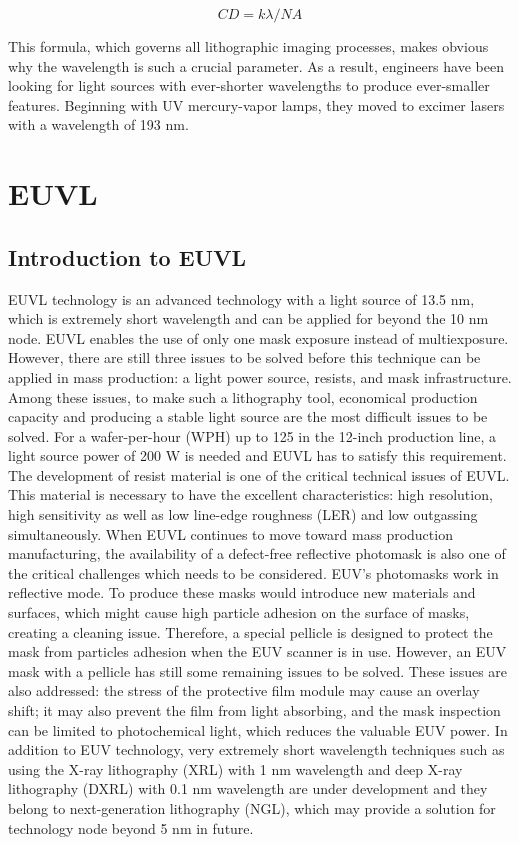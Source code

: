\documentclass[12pt,a4paper]{report}
\begin{document}
$$CD = {k}{\lambda}/NA$$


This formula, which governs all lithographic imaging processes, makes 
obvious why the wavelength is such a crucial parameter. As a result, 
engineers have been looking for light sources with ever-shorter 
wavelengths to produce ever-smaller features. Beginning with UV
 mercury-vapor lamps, they moved to excimer lasers with a wavelength of 193 nm. 



\chapter{EUVL}
\section{Introduction to EUVL}
EUVL technology is an advanced technology with a 
light source of 13.5 nm, which is extremely short 
wavelength and can be applied for beyond the 10 
nm node. EUVL enables the use of only one mask 
exposure instead of multiexposure. However, there 
are still three issues to be solved before this 
technique can be applied in mass production: a 
light power source, resists, and mask infrastructure. 
Among these issues, to make such a lithography tool, 
economical production capacity and producing a 
stable light source are the most difficult issues 
to be solved. For a wafer-per-hour (WPH) up to 125 
in the 12-inch production line, a light source 
power of 200 W is needed and EUVL has to satisfy 
this requirement.
The development of resist material is one of 
the critical technical issues of EUVL. This 
material is necessary to have the excellent 
characteristics: high resolution, high sensitivity 
as well as low line-edge roughness (LER) and low 
outgassing simultaneously.
When EUVL continues to move toward mass 
production manufacturing, the availability 
of a defect-free reflective photomask is also 
one of the critical challenges which needs to 
be considered. EUV's photomasks work in 
reflective mode. To produce these masks would 
introduce new materials and surfaces, which 
might cause high particle adhesion on the surface 
of masks, creating a cleaning issue. 
Therefore, a special pellicle is designed to 
protect the mask from particles adhesion when 
the EUV scanner is in use. However, an EUV mask 
with a pellicle has still some remaining issues 
to be solved. These issues are also addressed: 
the stress of the protective film module may 
cause an overlay shift; it may also prevent 
the film from light absorbing, and the mask 
inspection can be limited to photochemical light, 
which reduces the valuable EUV power.
In addition to EUV technology, very extremely 
short wavelength techniques such as using the 
X-ray lithography (XRL) with 1 nm wavelength 
 and deep X-ray lithography (DXRL) with 0.1 nm 
 wavelength are under development and they 
 belong to next-generation lithography (NGL), 
 which may provide a solution for technology 
 node beyond 5 nm in future.
\end{document}
